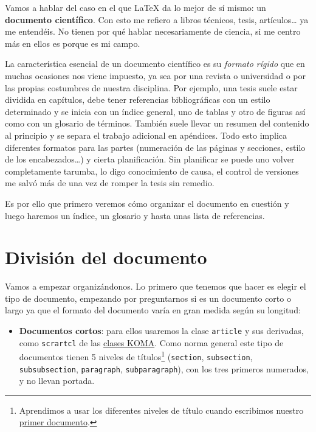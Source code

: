 Vamos a hablar del caso en el que LaTeX da lo mejor de sí mismo: un
\textbf{documento científico}. Con esto me refiero a libros técnicos,
tesis, artículos\ldots{} ya me entendéis. No tienen por qué hablar
necesariamente de ciencia, si me centro más en ellos es porque es mi
campo.

La característica esencial de un documento científico es su
\emph{formato rígido} que en muchas ocasiones nos viene impuesto, ya sea
por una revista o universidad o por las propias costumbres de nuestra
disciplina. Por ejemplo, una tesis suele estar dividida en capítulos,
debe tener referencias bibliográficas con un estilo determinado y se
inicia con un índice general, uno de tablas y otro de figuras así como
con un glosario de términos. También suele llevar un resumen del
contenido al principio y se separa el trabajo adicional en apéndices.
Todo esto implica diferentes formatos para las partes (numeración de las
páginas y secciones, estilo de los encabezados\ldots{}) y cierta
planificación. Sin planificar se puede uno volver completamente tarumba,
lo digo conocimiento de causa, el control de versiones me salvó más de
una vez de romper la tesis sin remedio.

Es por ello que primero veremos cómo organizar el documento en cuestión
y luego haremos un índice, un glosario y hasta unas lista de
referencias.

\section{División del documento}

Vamos a empezar organizándonos. Lo primero que tenemos que hacer es
elegir el tipo de documento, empezando por preguntarnos si es un
documento corto o largo ya que el formato del documento varía en gran
medida según su longitud:

\begin{itemize}
\item
  \textbf{Documentos cortos}: para ellos usaremos la clase
  \lstinline!article! y sus derivadas, como \lstinline!scrartcl! de las
  \href{https://www.ctan.org/pkg/koma-script}{clases KOMA}. Como norma
  general este tipo de documentos tienen 5 niveles de títulos\footnote{Aprendimos
    a usar los diferentes niveles de título cuando escribimos nuestro
    \href{https://ondiz.github.io/cursoLatex/Contenido/03.DocumentoBasico.html}{primer
    documento}.} (\lstinline!section!, \lstinline!subsection!,
  \lstinline!subsubsection!, \lstinline!paragraph!,
  \lstinline!subparagraph!), con los tres primeros numerados, y no
  llevan portada.
\end{itemize}

